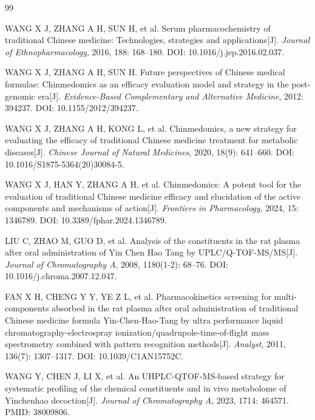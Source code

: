 \documentclass[12pt,a4paper,UTF8,openany]{ctexbook}
\begin{document}
{\small


}

\begingroup
\renewcommand{\section}[2]{}
\begin{thebibliography}{99}

WANG X J, ZHANG A H, SUN H, et al. Serum pharmacochemistry of traditional Chinese medicine: Technologies, strategies and applications[J]. \textit{Journal of Ethnopharmacology}, 2016, 188: 168--180. DOI: 10.1016/j.jep.2016.02.037.

WANG X J, ZHANG A H, SUN H. Future perspectives of Chinese medical formulae: Chinmedomics as an efficacy evaluation model and strategy in the post-genomic era[J]. \textit{Evidence-Based Complementary and Alternative Medicine}, 2012: 394237. DOI: 10.1155/2012/394237.

WANG X J, ZHANG A H, KONG L, et al. Chinmedomics, a new strategy for evaluating the efficacy of traditional Chinese medicine treatment for metabolic diseases[J]. \textit{Chinese Journal of Natural Medicines}, 2020, 18(9): 641--660. DOI: 10.1016/S1875-5364(20)30084-5.

WANG X J, HAN Y, ZHANG A H, et al. Chinmedomics: A potent tool for the evaluation of traditional Chinese medicine efficacy and elucidation of the active components and mechanisms of action[J]. \textit{Frontiers in Pharmacology}, 2024, 15: 1346789. DOI: 10.3389/fphar.2024.1346789.

LIU C, ZHAO M, GUO D, et al. Analysis of the constituents in the rat plasma after oral administration of Yin Chen Hao Tang by UPLC/Q-TOF-MS/MS[J]. \textit{Journal of Chromatography A}, 2008, 1180(1-2): 68--76. DOI: 10.1016/j.chroma.2007.12.047.

FAN X H, CHENG Y Y, YE Z L, et al. Pharmacokinetics screening for multi-components absorbed in the rat plasma after oral administration of traditional Chinese medicine formula Yin-Chen-Hao-Tang by ultra performance liquid chromatography-electrospray ionization/quadrupole-time-of-flight mass spectrometry combined with pattern recognition methods[J]. \textit{Analyst}, 2011, 136(7): 1307--1317. DOI: 10.1039/C1AN15752C.

WANG Y, CHEN J, LI X, et al. An UHPLC-QTOF-MS-based strategy for systematic profiling of the chemical constituents and in vivo metabolome of Yinchenhao decoction[J]. \textit{Journal of Chromatography A}, 2023, 1714: 464571. PMID: 38009806.


\end{thebibliography}
\end{document}

